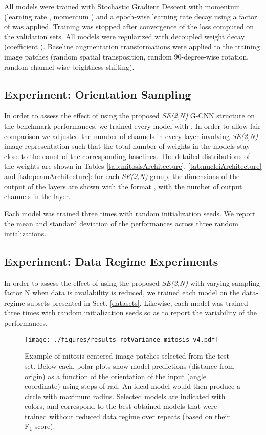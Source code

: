 \documentclass[twocolumn,final]{article}
\newcommand{\fscore}[1]{F\textsubscript{#1}-score}
\newcommand{\se}[1]{\textit{SE(#1)}}
\begin{document}
All models were trained with Stochastic Gradient Descent with momentum (learning rate , momentum ) and a epoch-wise learning rate decay using a factor of  was applied.
Training was stopped after convergence of the loss computed on the validation sets.
All models were regularized with decoupled weight decay (coefficient ). Baseline augmentation transformations were applied to the training image patches (random spatial transposition, random 90-degree-wise rotation, random channel-wise brightness shifting).

\subsection{Experiment: Orientation Sampling}
\label{sec:expOrientation}
In order to assess the effect of using the proposed \se{2,N} G-CNN structure on the benchmark performances, we trained every model with .
In order to allow fair comparison we adjusted the number of channels in every layer involving \se{2,N}-image representation such that the total number of weights in the models stay close to the count of the corresponding baselines.
The detailed distributions of the weights are shown in Tables \ref{tab:mitosisArchitecture}, \ref{tab:nucleiArchitecture} and \ref{tab:pcamArchitecture}: for each \se{2,N} group, the dimensions of the output of the layers are shown with the format , with  the number of output channels in the layer.

Each model was trained three times with random initialization seeds.
We report the mean and standard deviation of the performances across three random intializations.

\subsection{Experiment: Data Regime Experiments}
\label{expDataRegime}
In order to assess the effect of using the proposed \se{2,N} with varying sampling factor N when data is availability is reduced, we trained each model on the data-regime subsets presented in Sect. \ref{datasets}.
Likewise, each model was trained three times with random initialization seeds so as to report the variability of the performances.

\begin{figure*}[ht!]
\begin{center}
\texttt{[image: ./figures/results\_rotVariance\_mitosis\_v4.pdf]}
\caption{
\footnotesize
Example of mitosis-centered image patches selected from the test set.
Below each, polar plots show model predictions (distance from origin) as a function of the orientation of the input (angle coordinate) using steps of  rad.
An ideal model would then produce a circle with maximum radius.
Selected models are indicated with colors, and correspond to the best obtained models that were trained without reduced data regime over repeats (based on their \fscore{1}).
}
\label{fig:resultsQualitativeMitosis}
\end{center}
\end{figure*}
\end{document}
